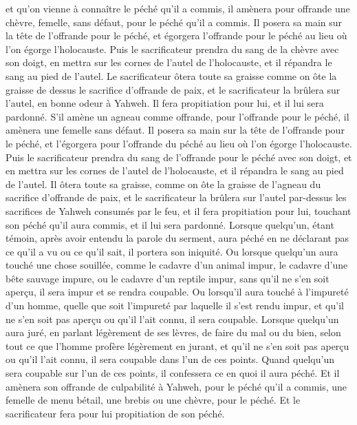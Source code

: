 \begin{multicols}{2}
et qu'on vienne à connaître le péché qu'il a commis, il amènera pour offrande une chèvre, femelle, sans défaut, pour le péché qu'il a commis.
Il posera sa main sur la tête de l'offrande pour le péché, et égorgera l'offrande pour le péché au lieu où l'on égorge l'holocauste.
Puis le sacrificateur prendra du sang de la chèvre avec son doigt, en mettra sur les cornes de l'autel de l'holocauste, et il répandra le sang au pied de l'autel.
Le sacrificateur ôtera toute sa graisse comme on ôte la graisse de dessus le sacrifice d’offrande de paix, et le sacrificateur la brûlera sur l'autel, en bonne odeur à Yahweh. Il fera propitiation pour lui, et il lui sera pardonné.
S'il amène un agneau comme offrande, pour l’offrande pour le péché, il amènera une femelle sans défaut.
Il posera sa main sur la tête de l'offrande pour le péché, et l'égorgera pour l’offrande du péché au lieu où l'on égorge l'holocauste.
Puis le sacrificateur prendra du sang de l'offrande pour le péché avec son doigt, et en mettra sur les cornes de l'autel de l'holocauste, et il répandra le sang au pied de l'autel.
Il ôtera toute sa graisse, comme on ôte la graisse de l'agneau du sacrifice d’offrande de paix, et le sacrificateur la brûlera sur l'autel par-dessus les sacrifices de Yahweh consumés par le feu, et il fera propitiation pour lui, touchant son péché qu'il aura commis, et il lui sera pardonné.
\VerseOne{}Lorsque quelqu’un, étant témoin, après avoir entendu la parole du serment, aura péché en ne déclarant pas ce qu’il a vu ou ce qu’il sait, il portera son iniquité.
Ou lorsque quelqu’un aura touché une chose souillée, comme le cadavre d’un animal impur, le cadavre d’une bête sauvage impure, ou le cadavre d’un reptile impur, sans qu’il ne s’en soit aperçu, il sera impur et se rendra coupable.
Ou lorsqu’il aura touché à l’impureté d'un homme, quelle que soit l’impureté par laquelle il s’est rendu impur, et qu'il ne s'en soit pas aperçu ou qu'il l'ait connu, il sera coupable.
Lorsque quelqu'un aura juré, en parlant légèrement de ses lèvres, de faire du mal ou du bien, selon tout ce que l'homme profère légèrement en jurant, et qu'il ne s'en soit pas aperçu ou qu'il l'ait connu, il sera coupable dans l'un de ces points.
Quand quelqu'un sera coupable sur l'un de ces points, il confessera ce en quoi il aura péché.
Et il amènera son offrande de culpabilité à Yahweh, pour le péché qu'il a commis, une femelle de menu bétail, une brebis ou une chèvre, pour le péché. Et le sacrificateur fera pour lui propitiation de son péché.

\end{multicols}
